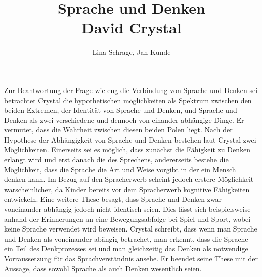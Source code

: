 \documentclass{article}
\title{Sprache und Denken \\ David Crystal}
\author{Lina Schrage, Jan Kunde}
\begin{document}
\maketitle
Zur Beantwortung der Frage wie eng die Verbindung von Sprache und Denken sei betrachtet Crystal die hypothetischen möglichkeiten als Spektrum zwischen den beiden Extremen,
der Identität von Sprache und Denken, und Sprache und Denken als zwei verschiedene und dennoch von einander abhängige Dinge. Er vermutet, dass die Wahrheit zwischen diesen beiden Polen liegt. Nach der Hypothese der Abhängigkeit von Sprache und Denken bestehen laut Crystal zwei Möglichkeiten. Einerseits sei es möglich, dass zunächst die Fähigkeit zu Denken erlangt wird und erst danach die des Sprechens, andererseits bestehe die Möglichkeit, dass die Sprache die Art und Weise vorgibt in der ein Mensch denken kann. Im Bezug auf den Spracherwerb scheint jedoch erstere Möglichkeit warscheinlicher, da Kinder bereits vor dem Spracherwerb kognitive Fähigkeiten entwickeln. Eine weitere These besagt, dass Sprache und Denken zwar voneinander abhängig jedoch nicht identisch seien. Dies lässt sich beispielsweise anhand der Erinnerungen an eine Bewegungsabfolge bei Spiel und Sport, wobei keine Sprache verwendet wird beweisen. Crystal schreibt, dass wenn man Sprache und Denken als voneinander abängig betrachet, man erkennt, dass die Sprache ein Teil des Denkprozesses sei und man gleichzeitig das Denken als notwendige Vorraussetzung für das Sprachverständnis ansehe. Er beendet seine These mit der Aussage, dass sowohl Sprache als auch Denken wesentlich seien.
\end{document}
